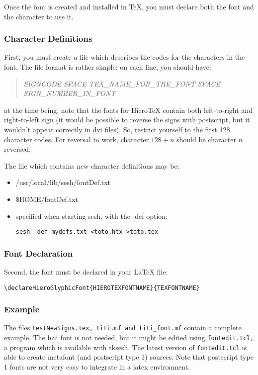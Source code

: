 \documentclass[final]{article}
\newcommand{\HieroTeX}{Hiero\TeX{}}
\begin{document}
Once the font is created and installed in TeX, you must declare both
the font and the character to use it.

\subsubsection{Character Definitions}


First, you must create a file which describes the codes for the
characters in the font. The file format is rather simple:
on each line, you should have:
\begin{quotation}
  \textsl{SIGNCODE SPACE TEX\_NAME\_FOR\_THE\_FONT SPACE SIGN\_NUMBER\_IN\_FONT} 
\end{quotation}
at the time being, note that the fonts for \HieroTeX{} contain both
left-to-right and right-to-left sign (it would be possible to reverse
the signs with postscript, but it wouldn't appear correctly in dvi
files). So, restrict yourself to the first 128 character codes. For
reversal to work, character $128 + n$ should be character $n$
reversed.

The file which contains new character definitions may be:
\begin{itemize}
\item /usr/local/lib/sesh/fontDef.txt
\item \$HOME/fontDef.txt
\item specified when starting sesh, with the -def option:
\begin{verbatim}
sesh -def mydefs.txt <toto.htx >toto.tex
\end{verbatim}
\end{itemize}
\subsubsection{Font Declaration}

Second, the font must be declared in your \LaTeX{} file:
\begin{verbatim}
\declareHieroGlyphicFont{HIEROTEXFONTNAME}{TEXFONTNAME}
\end{verbatim}

\subsubsection{Example}

The files \texttt{testNewSigns.tex, titi.mf and titi\_font.mf} contain
a complete example. The \texttt{bzr} font is not needed, but it might
be edited using \texttt{fontedit.tcl,} a program which is available
with tksesh. The latest version of \texttt{fontedit.tcl} is able to
create metafont (and postscript type 1) sources. Note that postscript
type 1 fonts are not very easy to integrate in a latex environment.
\end{document}
